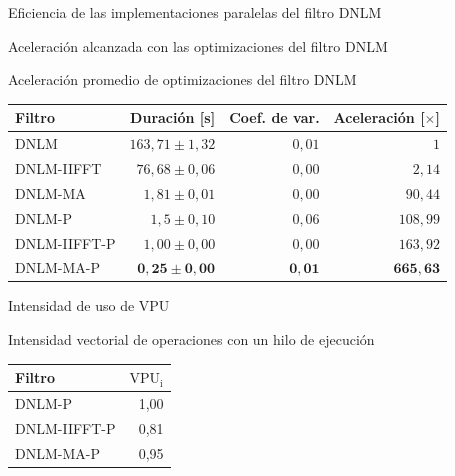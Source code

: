 \documentclass[15pt]{beamer} %
\begin{document}
\begin{frame}{Eficiencia de las implementaciones paralelas del filtro DNLM}

	\begin{center}
	\end{center}
\end{frame}

\begin{frame}{Aceleraci\'on alcanzada con las optimizaciones del filtro DNLM}
  


  \begin{center}
    {\footnotesize Aceleración promedio de optimizaciones del filtro DNLM}
    \begin{tabular}{lrrr}
	Filtro & Duración [s]& Coef. de var. & Aceleración [$\times$]\tabularnewline
	\hline
	DNLM & $163,71\pm1,32$ & $0,01$ & $1$\tabularnewline
	DNLM-IIFFT & $76,68\pm0,06$ & $0,00$ & $2,14$\tabularnewline
	DNLM-MA & $1,81\pm 0,01$ & $0,00$ & $90,44$ \tabularnewline
	DNLM-P & $1,5\pm0,10$ & $0,06$ & $108,99$\tabularnewline
	DNLM-IIFFT-P & $1,00\pm0,00$ & $0,00$ & $163,92$ \tabularnewline 
	DNLM-MA-P & $\boldsymbol{0,25\pm0,00}$ & $\boldsymbol{0,01}$ &  $\boldsymbol{665,63}$\tabularnewline
	\end{tabular}
  \end{center}
\end{frame}


\begin{frame}{Intensidad de uso de VPU}
  
  \begin{center}
    {\footnotesize Intensidad vectorial de operaciones con un hilo de ejecución}
    \begin{tabular}{lr}
	 Filtro & $\text{VPU}_{\text{i}}$ \tabularnewline
	\hline
	DNLM-P & 1,00 \tabularnewline
	DNLM-IIFFT-P & 0,81 \tabularnewline
	DNLM-MA-P & 0,95 \tabularnewline
	\end{tabular}
  \end{center}
\end{frame}
\end{document}
